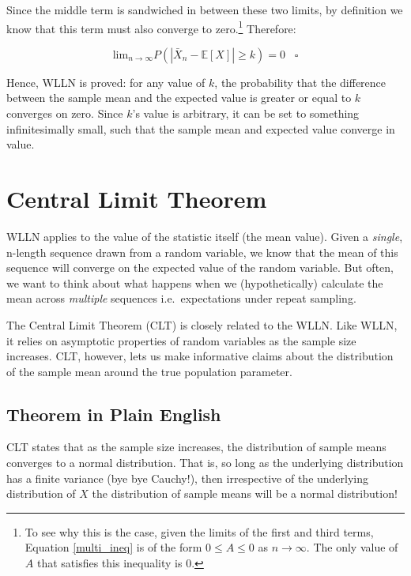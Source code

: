\documentclass[
]{book}
\begin{document}
Since the middle term is sandwiched in between these two limits, by definition we know that this term must also converge to zero.\footnote{To see why this is the case, given the limits of the first and third terms, Equation \ref{multi_ineq} is of the form $0 \leq A \leq 0$ as $n \to \infty$. The only value of $A$ that satisfies this inequality is 0.} Therefore:

\begin{equation}
\text{lim}_{n \to \infty} P(|\bar{X}_{n}−\mathbb{E}[X]| \geq k) = 0 \; \; \; \square
\end{equation}

Hence, WLLN is proved: for any value of \(k\), the probability that the difference between the sample mean and the expected value is greater or equal to \(k\) converges on zero. Since \(k\)'s value is arbitrary, it can be set to something infinitesimally small, such that the sample mean and expected value converge in value.

\hypertarget{clt}{%
\section{Central Limit Theorem}\label{clt}}

WLLN applies to the value of the statistic itself (the mean value). Given a \emph{single}, n-length sequence drawn from a random variable, we know that the mean of this sequence will converge on the expected value of the random variable. But often, we want to think about what happens when we (hypothetically) calculate the mean across \emph{multiple} sequences i.e.~expectations under repeat sampling.

The Central Limit Theorem (CLT) is closely related to the WLLN. Like WLLN, it relies on asymptotic properties of random variables as the sample size increases. CLT, however, lets us make informative claims about the distribution of the sample mean around the true population parameter.

\hypertarget{theorem-in-plain-english-1}{%
\subsection{Theorem in Plain English}\label{theorem-in-plain-english-1}}

CLT states that as the sample size increases, the distribution of sample means converges to a normal distribution. That is, so long as the underlying distribution has a finite variance (bye bye Cauchy!), then irrespective of the underlying distribution of \(X\) the distribution of sample means will be a normal distribution!
\end{document}
